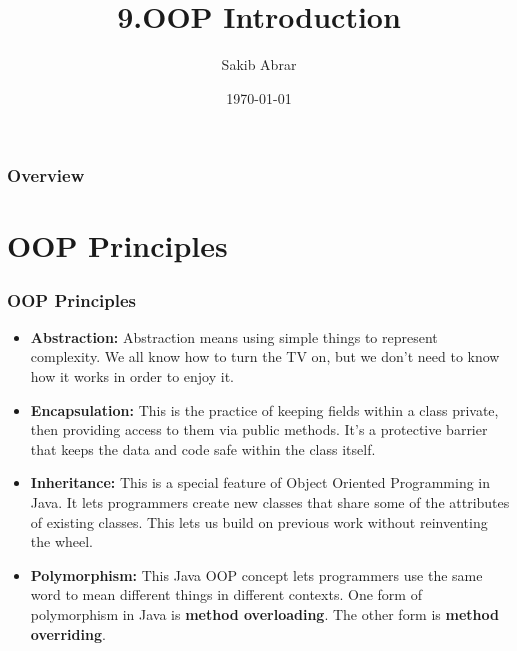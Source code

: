 \documentclass{beamer}
\title[OOP]{9.OOP Introduction} %
\author{Sakib Abrar} %
\institute[BUET] %
{
CSE\\~\\Bangladesh University of Engineering \& Technology \\ %
\medskip
\textit{sakib.cghs@gmail.com} %
}
\date{\today} %
\begin{document}
\begin{frame}
\titlepage %
\end{frame}

\begin{frame}
\frametitle{Overview} %
\tableofcontents %
\end{frame}


\section{OOP Principles}

\begin{frame}
\frametitle{OOP Principles}
\begin{itemize}
\item \textbf{Abstraction:} Abstraction means using simple things to represent complexity. We all know how to turn the TV on, but we don’t need to know how it works in order to enjoy it. 
\item \textbf{Encapsulation:} This is the practice of keeping fields within a class private, then providing access to them via public methods. It’s a protective barrier that keeps the data and code safe within the class itself. 
\item \textbf{Inheritance:} This is a special feature of Object Oriented Programming in Java. It lets programmers create new classes that share some of the attributes of existing classes. This lets us build on previous work without reinventing the wheel.
\item \textbf{Polymorphism:} This Java OOP concept lets programmers use the same word to mean different things in different contexts. One form of polymorphism in Java is \textbf{method overloading}. The other form is \textbf{method overriding}. 
\end{itemize}
\end{frame}
\end{document}
